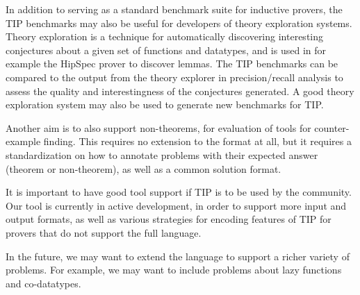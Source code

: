 \documentclass{llncs}
\begin{document}
In addition to serving as a standard benchmark suite for 
inductive provers, the TIP benchmarks may also be useful for 
developers of theory exploration systems. Theory exploration is 
a technique for automatically discovering interesting 
conjectures about a given set of functions and datatypes, and is 
used in for example the HipSpec prover to discover lemmas. The 
TIP benchmarks can be compared to the output from the theory 
explorer in precision/recall analysis to assess the quality and 
interestingness of the conjectures generated. A good theory 
exploration system may also be used to generate new benchmarks 
for TIP.


Another aim is to also support non-theorems, for evaluation of 
tools for counter-example finding. This requires no extension to 
the format at all, but it requires a standardization on how to 
annotate problems with their expected answer (theorem or non-theorem), 
as well as a common solution format.

It is important to have good tool support if TIP is to be used 
by the community. Our tool is currently in active development, 
in order to support more input and output formats, as well as 
various strategies for encoding features of TIP for provers that 
do not support the full language.


In the future, we may want to extend the language to support a 
richer variety of problems. For example, we may want to include 
problems about lazy functions and co-datatypes.




\end{document}
